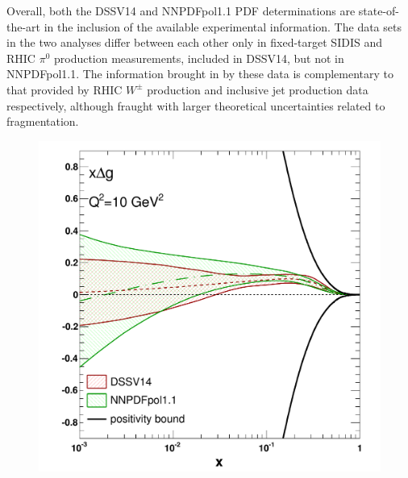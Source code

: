 Overall, both the DSSV14 and NNPDFpol1.1 PDF determinations are 
state-of-the-art in the inclusion of the available experimental information. 
%
The data sets in the two analyses differ between each other only in
fixed-target SIDIS and RHIC $\pi^0$ production measurements, included in 
DSSV14, but not in NNPDFpol1.1. 
%
The information brought in by these data is complementary to that provided by 
RHIC $W^\pm$ production and inclusive jet production data respectively,
although fraught with larger theoretical uncertainties related to fragmentation.

\begin{figure}[!t]

\hspace*{6mm}
\includegraphics[scale=0.325]{plots/gluoncomp}


\end{figure}
